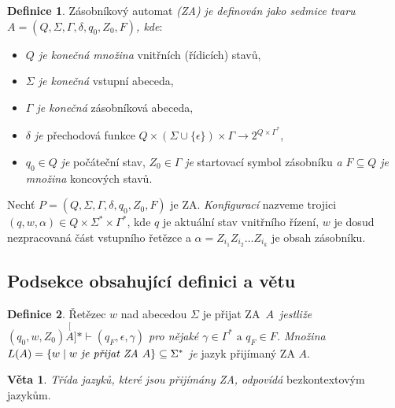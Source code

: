 \documentclass[hidelinks, 11pt, a4paper, twocolumn]{article}
\theoremstyle{definition}
\newtheorem{definice}{Definice}
\theoremstyle{definition}
\newtheorem{veta}{Věta}
\begin{document}
\begin{definice}
\label{definice1}
Zásobníkový automat
 \emph{(ZA) je definován jako sedmice tvaru $A=(Q, \Sigma, \Gamma, \delta, q_{0}, Z_{0}, F) $, kde}:
 \begin{itemize}
  \item \emph{$Q$ je konečná množina} vnitřních (řídicích) stavů,
   \item \emph{$\Sigma$ je konečná} vstupní abeceda,
   \item \emph{$\Gamma$ je konečná} zásobníková abeceda,
   \item \emph{$\delta$ je} přechodová funkce $Q \times (\Sigma \cup \{\epsilon\}) \times \Gamma \to 2^{Q \times \Gamma^\ast} $,
   \item $q_{0} \in Q$ \emph{je} počáteční stav, $Z_{0} \in \Gamma$ \emph{je} startovací symbol zásobníku \emph{a $F \subseteq Q$ je množina} koncových
     stavů.
\end{itemize}

    Nechť $P=(Q, \Sigma, \Gamma, \delta, q_{0}, Z_{0}, F)$ je ZA. \emph{Konfigurací} nazveme trojici $(q,w,\alpha) \in Q \times \Sigma^\ast \times \Gamma^\ast$,
     kde $q$ je aktuální stav vnitřního řízení, $w$ je dosud nezpracovaná část
      vstupního řetězce a $\alpha = Z_{i_1}Z_{i_2} \dots Z_{i_k}$ je obsah zásobníku.

\end{definice}

\subsection{Podsekce obsahující definici a větu}

\begin{definice}
\label{definice2}
Řetězec $w$ nad abecedou $\Sigma$ je přijat ZA~$A$~\emph{jestliže $(q_0, w, Z_0)\stackrel[A]{\ast}{\vdash}(q_F, \epsilon, \gamma) $ pro nějaké $\gamma \in \Gamma^\ast \text{ a } q_F \in F$. Množina $L(A) = \{w \mid w \text{ \textit{je přijat ZA }}A\} \subseteq \Sigma^\ast$ je} jazyk přijímaný ZA $A$.
\end{definice}

\begin{veta}
\label{veta1}
\emph{Třída jazyků, které jsou přijímány ZA, odpovídá} bezkontextovým jazykům.
\end{veta}
\end{document}
